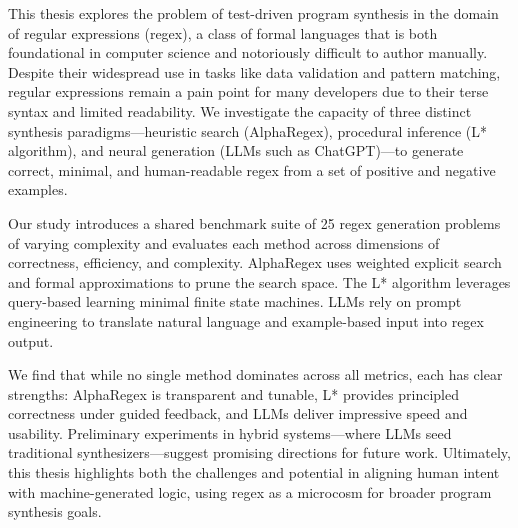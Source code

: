 
\pagestyle{plain}
\setcounter{page}{1}



\indent\indent This thesis explores the problem of test-driven program synthesis in the domain of regular expressions (regex), a class of formal languages that is both foundational in computer science and notoriously difficult to author manually. Despite their widespread use in tasks like data validation and pattern matching, regular expressions remain a pain point for many developers due to their terse syntax and limited readability. We investigate the capacity of three distinct synthesis paradigms—heuristic search (AlphaRegex), procedural inference (L* algorithm), and neural generation (LLMs such as ChatGPT)—to generate correct, minimal, and human-readable regex from a set of positive and negative examples.

\indent\indent Our study introduces a shared benchmark suite of 25 regex generation problems of varying complexity and evaluates each method across dimensions of correctness, efficiency, and complexity. AlphaRegex uses weighted explicit search and formal approximations to prune the search space. The L* algorithm leverages query-based learning minimal finite state machines. LLMs rely on prompt engineering to translate natural language and example-based input into regex output.

\indent\indent We find that while no single method dominates across all metrics, each has clear strengths: AlphaRegex is transparent and tunable, L* provides principled correctness under guided feedback, and LLMs deliver impressive speed and usability. Preliminary experiments in hybrid systems—where LLMs seed traditional synthesizers—suggest promising directions for future work. Ultimately, this thesis highlights both the challenges and potential in aligning human intent with machine-generated logic, using regex as a microcosm for broader program synthesis goals.
 

\pagebreak{}
